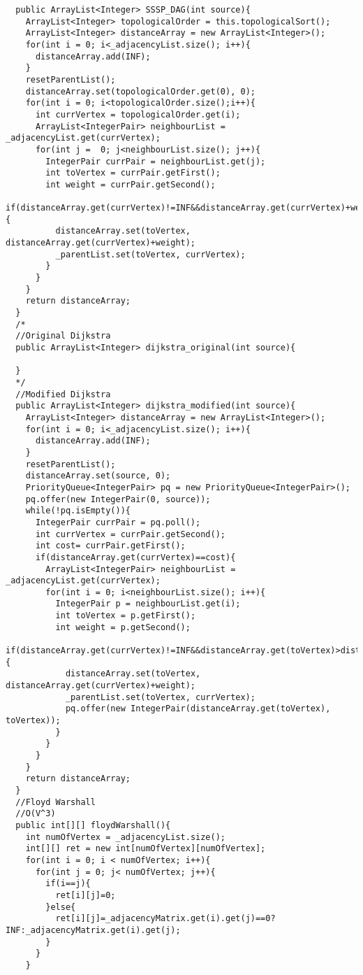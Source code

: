 \documentclass[11pt]{article}
\theoremstyle{definition}
\begin{document}
\begin{verbatim}
  public ArrayList<Integer> SSSP_DAG(int source){
    ArrayList<Integer> topologicalOrder = this.topologicalSort();
    ArrayList<Integer> distanceArray = new ArrayList<Integer>();
    for(int i = 0; i<_adjacencyList.size(); i++){
      distanceArray.add(INF);
    }
    resetParentList();
    distanceArray.set(topologicalOrder.get(0), 0);
    for(int i = 0; i<topologicalOrder.size();i++){
      int currVertex = topologicalOrder.get(i);
      ArrayList<IntegerPair> neighbourList = _adjacencyList.get(currVertex);
      for(int j =  0; j<neighbourList.size(); j++){
        IntegerPair currPair = neighbourList.get(j);
        int toVertex = currPair.getFirst();
        int weight = currPair.getSecond();
        if(distanceArray.get(currVertex)!=INF&&distanceArray.get(currVertex)+weight<distanceArray.get(toVertex)){
          distanceArray.set(toVertex, distanceArray.get(currVertex)+weight);
          _parentList.set(toVertex, currVertex);
        }
      }
    }
    return distanceArray;
  }
  /*
  //Original Dijkstra
  public ArrayList<Integer> dijkstra_original(int source){
    
  }
  */
  //Modified Dijkstra
  public ArrayList<Integer> dijkstra_modified(int source){
    ArrayList<Integer> distanceArray = new ArrayList<Integer>();
    for(int i = 0; i<_adjacencyList.size(); i++){
      distanceArray.add(INF);
    }
    resetParentList();
    distanceArray.set(source, 0);
    PriorityQueue<IntegerPair> pq = new PriorityQueue<IntegerPair>();
    pq.offer(new IntegerPair(0, source));
    while(!pq.isEmpty()){
      IntegerPair currPair = pq.poll();
      int currVertex = currPair.getSecond();
      int cost= currPair.getFirst();
      if(distanceArray.get(currVertex)==cost){
        ArrayList<IntegerPair> neighbourList = _adjacencyList.get(currVertex);
        for(int i = 0; i<neighbourList.size(); i++){
          IntegerPair p = neighbourList.get(i);
          int toVertex = p.getFirst();
          int weight = p.getSecond();
          if(distanceArray.get(currVertex)!=INF&&distanceArray.get(toVertex)>distanceArray.get(currVertex)+weight){
            distanceArray.set(toVertex, distanceArray.get(currVertex)+weight);
            _parentList.set(toVertex, currVertex);
            pq.offer(new IntegerPair(distanceArray.get(toVertex), toVertex));
          }
        }
      }
    }
    return distanceArray;
  }
  //Floyd Warshall
  //O(V^3)
  public int[][] floydWarshall(){
    int numOfVertex = _adjacencyList.size();
    int[][] ret = new int[numOfVertex][numOfVertex];
    for(int i = 0; i < numOfVertex; i++){
      for(int j = 0; j< numOfVertex; j++){
        if(i==j){
          ret[i][j]=0;
        }else{
          ret[i][j]=_adjacencyMatrix.get(i).get(j)==0?INF:_adjacencyMatrix.get(i).get(j);
        }
      }
    }


\end{verbatim}
\end{document}
